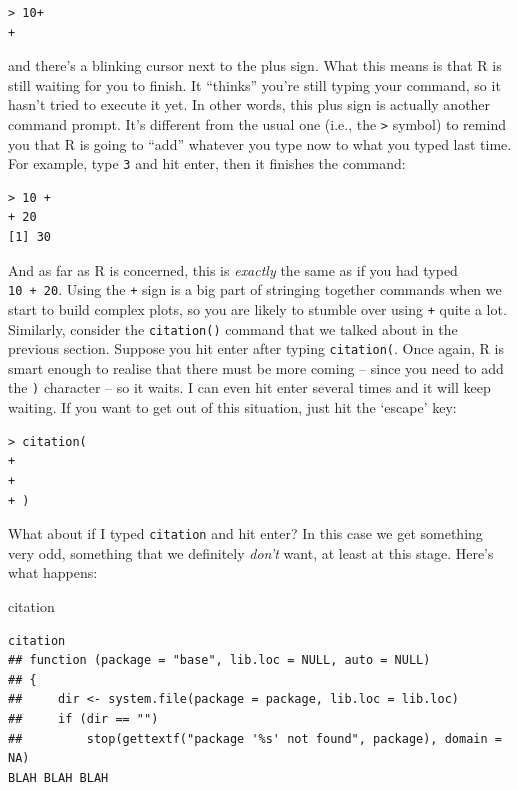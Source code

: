 \documentclass[
]{book}
\newenvironment{Shaded}{\begin{snugshade}}{\end{snugshade}}
\newcommand{\NormalTok}[1]{#1}
\begin{document}
\begin{verbatim}
> 10+
+ 
\end{verbatim}

and there's a blinking cursor next to the plus sign. What this means is that R is still waiting for you to finish. It ``thinks'' you're still typing your command, so it hasn't tried to execute it yet. In other words, this plus sign is actually another command prompt. It's different from the usual one (i.e., the \texttt{\textgreater{}} symbol) to remind you that R is going to ``add'' whatever you type now to what you typed last time. For example, type \texttt{3} and hit enter, then it finishes the command:

\begin{verbatim}
> 10 +
+ 20
[1] 30
\end{verbatim}

And as far as R is concerned, this is \emph{exactly} the same as if you had typed \texttt{10\ +\ 20}. Using the \texttt{+} sign is a big part of stringing together commands when we start to build complex plots, so you are likely to stumble over using \texttt{+} quite a lot. Similarly, consider the \texttt{citation()} command that we talked about in the previous section. Suppose you hit enter after typing \texttt{citation(}. Once again, R is smart enough to realise that there must be more coming -- since you need to add the \texttt{)} character -- so it waits. I can even hit enter several times and it will keep waiting. If you want to get out of this situation, just hit the `escape' key:

\begin{verbatim}
> citation(
+ 
+ 
+ )
\end{verbatim}

What about if I typed \texttt{citation} and hit enter? In this case we get something very odd, something that we definitely \emph{don't} want, at least at this stage. Here's what happens:

\begin{Shaded}
\begin{Highlighting}[]
\NormalTok{citation}
\end{Highlighting}
\end{Shaded}

\begin{verbatim}
citation
## function (package = "base", lib.loc = NULL, auto = NULL) 
## {
##     dir <- system.file(package = package, lib.loc = lib.loc)
##     if (dir == "") 
##         stop(gettextf("package '%s' not found", package), domain = NA)
BLAH BLAH BLAH
\end{verbatim}
\end{document}

